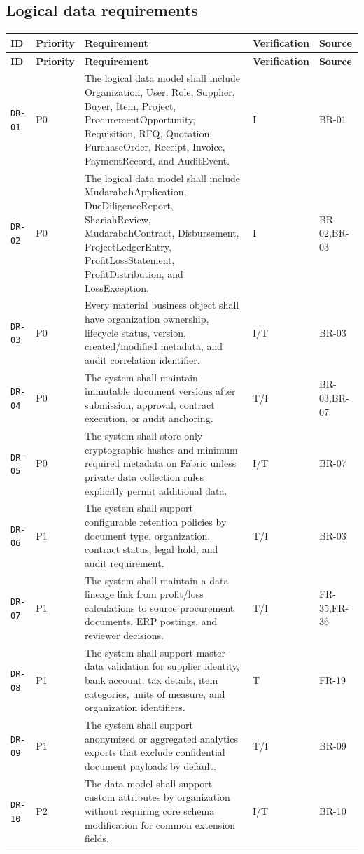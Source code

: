 \documentclass[11pt,a4paper]{article}
\begin{document}
\subsection{Logical data requirements}\label{sec:data}
\begin{footnotesize}
\begin{longtable}{@{}p{}p{}p{}p{}p{}@{}}
\rowcolor{gray!18}\textbf{ID} & \textbf{Priority} & \textbf{Requirement} & \textbf{Verification} & \textbf{Source} \\ \hline
\endfirsthead
\rowcolor{gray!18}\textbf{ID} & \textbf{Priority} & \textbf{Requirement} & \textbf{Verification} & \textbf{Source} \\ \hline
\endhead
\texttt{DR-01} & P0 & The logical data model shall include Organization, User, Role, Supplier, Buyer, Item, Project, ProcurementOpportunity, Requisition, RFQ, Quotation, PurchaseOrder, Receipt, Invoice, PaymentRecord, and AuditEvent. & I & BR-01 \\ \hline
\texttt{DR-02} & P0 & The logical data model shall include MudarabahApplication, DueDiligenceReport, ShariahReview, MudarabahContract, Disbursement, ProjectLedgerEntry, ProfitLossStatement, ProfitDistribution, and LossException. & I & BR-02,BR-03 \\ \hline
\texttt{DR-03} & P0 & Every material business object shall have organization ownership, lifecycle status, version, created/modified metadata, and audit correlation identifier. & I/T & BR-03 \\ \hline
\texttt{DR-04} & P0 & The system shall maintain immutable document versions after submission, approval, contract execution, or audit anchoring. & T/I & BR-03,BR-07 \\ \hline
\texttt{DR-05} & P0 & The system shall store only cryptographic hashes and minimum required metadata on Fabric unless private data collection rules explicitly permit additional data. & I/T & BR-07 \\ \hline
\texttt{DR-06} & P1 & The system shall support configurable retention policies by document type, organization, contract status, legal hold, and audit requirement. & T/I & BR-03 \\ \hline
\texttt{DR-07} & P1 & The system shall maintain a data lineage link from profit/loss calculations to source procurement documents, ERP postings, and reviewer decisions. & T/I & FR-35,FR-36 \\ \hline
\texttt{DR-08} & P1 & The system shall support master-data validation for supplier identity, bank account, tax details, item categories, units of measure, and organization identifiers. & T & FR-19 \\ \hline
\texttt{DR-09} & P1 & The system shall support anonymized or aggregated analytics exports that exclude confidential document payloads by default. & T/I & BR-09 \\ \hline
\texttt{DR-10} & P2 & The data model shall support custom attributes by organization without requiring core schema modification for common extension fields. & I/T & BR-10 \\ \hline
\end{longtable}
\end{footnotesize}
\end{document}
